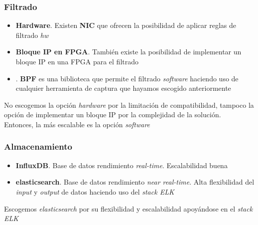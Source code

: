 \documentclass{beamer}
\begin{document}
\begin{frame}[fragile] %
\frametitle{Filtrado}

\begin{itemize}
	\item \textbf{Hardware}. Existen \textbf{NIC} que ofrecen la posibilidad de aplicar reglas de filtrado \textit{hw}
	\item \textbf{Bloque IP en FPGA}. También existe la posibilidad de implementar un bloque IP en una FPGA para el filtrado
	\item \textbf{\color{purple}{Software}}. \textbf{BPF} es una biblioteca que permite el filtrado \textit{software} haciendo uso de cualquier herramienta de captura que hayamos escogido anteriormente
\end{itemize}

No escogemos la opción \textit{hardware} por la limitación de compatibilidad, tampoco la opción de implementar un bloque IP por la complejidad de la solución.\\
Entonces, la más escalable es la opción \textit{software}

\end{frame}


\begin{frame}
\frametitle{Almacenamiento}

\begin{itemize}
	\item \textbf{InfluxDB}. Base de datos rendimiento \textit{real-time}. Escalabilidad buena
	\item \textbf{elasticsearch}. Base de datos rendimiento \textit{near real-time}. Alta flexibilidad del \textit{input} y \textit{output} de datos haciendo uso del \textit{stack ELK}
\end{itemize}

Escogemos \textit{elasticsearch} por su flexibilidad y escalabilidad apoyándose en el \textit{stack ELK}

\end{frame}

\end{document}
